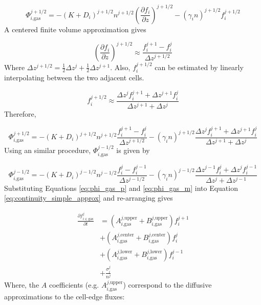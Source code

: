 \documentclass{article}
\begin{document}
\begin{equation}
  \Phi_{i\text{,gas}}^{j+1/2} = - ( K + D_{i})^{j+1/2} n^{j+1/2} \left( \frac{\partial f_{i}}{\partial z} \right)^{j+1/2} - (\gamma_{i} n)^{j+1/2} f_{i}^{j+1/2}
\end{equation}
A centered finite volume approximation gives 

$$\left( \frac{\partial f_{i}}{\partial z} \right)^{j+1/2} \approx \frac{f_i^{j+1} - f_i^{j}}{\Delta z^{j+1/2}}$$
Where $\Delta z^{j+1/2} = \frac{1}{2}\Delta z^j + \frac{1}{2} \Delta z^{j+1}$. Also, $f_{i}^{j+1/2}$ can be estimated by linearly interpolating between the two adjacent cells.

$$f_{i}^{j+1/2} \approx \frac{\Delta z^{j}f_i^{j+1} + \Delta z^{j+1} f_i^{j}}{\Delta z^{j+1}+\Delta z^{j}}$$
Therefore,

\begin{equation} \label{eq:phi_gas_p}
  \Phi_{i\text{,gas}}^{j+1/2} = - ( K + D_{i})^{j+1/2} n^{j+1/2} \frac{f_i^{j+1} - f_i^{j}}{\Delta z^{j+1/2}} - (\gamma_{i} n)^{j+1/2} \frac{\Delta z^{j}f_i^{j+1} + \Delta z^{j+1} f_i^{j}}{\Delta z^{j+1}+\Delta z^{j}}
\end{equation}
Using an similar procedure, $\Phi_{i\text{,gas}}^{j-1/2}$ is given by

\begin{equation} \label{eq:phi_gas_m}
  \Phi_{i\text{,gas}}^{j-1/2} = - ( K + D_{i})^{j-1/2} n^{j-1/2} \frac{f_i^{j} - f_i^{j-1}}{\Delta z^{j-1/2}} - (\gamma_{i} n)^{j-1/2} \frac{\Delta z^{j-1}f_i^{j} + \Delta z^{j} f_i^{j-1}}{\Delta z^{j}+\Delta z^{j-1}}
\end{equation}
Substituting Equations \eqref{eq:phi_gas_p} and \eqref{eq:phi_gas_m} into Equation \eqref{eq:continuity_simple_approx} and re-arranging gives

\begin{equation}
\begin{split} 
  \frac{\partial f_{i \in \text{gas}}^j}{\partial t} &= (A_{i\text{,gas}}^{j\text{,upper}}+ B_{i\text{,gas}}^{j\text{,upper}}) f_{i}^{j+1} \\
  &+ (A_{i\text{,gas}}^{j\text{,center}} + B_{i\text{,gas}}^{j\text{,center}}) f_{i}^{j} \\
  &+ (A_{i\text{,gas}}^{j\text{,lower}} + B_{i\text{,gas}}^{j\text{,lower}}) f_{i}^{j-1} \\
  &+ \frac{\sigma_i^j}{n^{j}}
\end{split}
\end{equation}
Where, the $A$ coefficients (e.g. $A_{i\text{,gas}}^{j\text{,upper}}$) correspond to the diffusive approximations to the cell-edge fluxes:
\end{document}
